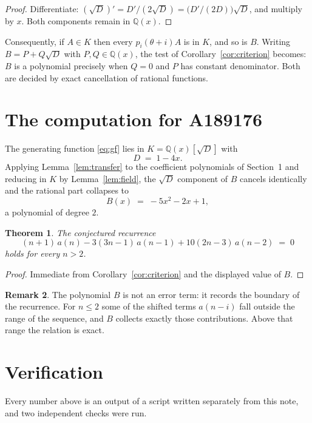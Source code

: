 \documentclass[11pt,a4paper]{article}
\theoremstyle{plain}
\newtheorem{theorem}{Theorem}
\theoremstyle{definition}
\newtheorem{remark}[theorem]{Remark}
\begin{document}
\begin{proof}
Differentiate: $(\sqrt{D})'=D'/(2\sqrt{D})=\bigl(D'/(2D)\bigr)\sqrt{D}$, and multiply by
$x$. Both components remain in $\mathbb{Q}(x)$.
\end{proof}

Consequently, if $A\in K$ then every $p_{i}(\theta+i)A$ is in $K$, and so is $B$. Writing
$B=P+Q\sqrt{D}$ with $P,Q\in\mathbb{Q}(x)$, the test of Corollary~\ref{cor:criterion}
becomes: $B$ is a polynomial precisely when $Q=0$ and $P$ has constant denominator. Both
are decided by exact cancellation of rational functions.

\section{The computation for A189176}

The generating function \eqref{eq:gf} lies in $K=\mathbb{Q}(x)[\sqrt{D}]$ with
\[
D \;=\; 1 - 4 x .
\]
Applying Lemma~\ref{lem:transfer} to the coefficient polynomials of Section~1 and reducing
in $K$ by Lemma~\ref{lem:field}, the $\sqrt{D}$ component of $B$ cancels identically and
the rational part collapses to
\[
B(x)\;=\;- 5 x^{2} - 2 x + 1 ,
\]
a polynomial of degree $2$.

\begin{theorem}
The conjectured recurrence
\[
(n + 1)\,a(n) -  3 \left(3 n - 1\right)\,a(n-1) + 10 \left(2 n - 3\right)\,a(n-2) \;=\;0
\]
holds for every $n>2$.
\end{theorem}

\begin{proof}
Immediate from Corollary~\ref{cor:criterion} and the displayed value of $B$.
\end{proof}

\begin{remark}
The polynomial $B$ is not an error term: it records the boundary of the recurrence. For
$n\le2$ some of the shifted terms $a(n-i)$ fall outside the range of the sequence,
and $B$ collects exactly those contributions. Above that range the relation is exact.
\end{remark}

\section{Verification}

Every number above is an output of a script written separately from this note, and two
independent checks were run.
\end{document}
